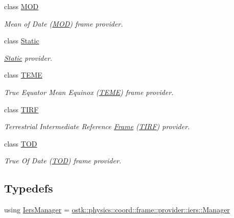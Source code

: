 \begin{DoxyCompactItemize}
class \hyperlink{classostk_1_1physics_1_1coord_1_1frame_1_1provider_1_1_m_o_d}{M\+OD}
\begin{DoxyCompactList}\small\item\em Mean of Date (\hyperlink{classostk_1_1physics_1_1coord_1_1frame_1_1provider_1_1_m_o_d}{M\+OD}) frame provider. \end{DoxyCompactList}\item 
class \hyperlink{classostk_1_1physics_1_1coord_1_1frame_1_1provider_1_1_static}{Static}
\begin{DoxyCompactList}\small\item\em \hyperlink{classostk_1_1physics_1_1coord_1_1frame_1_1provider_1_1_static}{Static} provider. \end{DoxyCompactList}\item 
class \hyperlink{classostk_1_1physics_1_1coord_1_1frame_1_1provider_1_1_t_e_m_e}{T\+E\+ME}
\begin{DoxyCompactList}\small\item\em True Equator Mean Equinox (\hyperlink{classostk_1_1physics_1_1coord_1_1frame_1_1provider_1_1_t_e_m_e}{T\+E\+ME}) frame provider. \end{DoxyCompactList}\item 
class \hyperlink{classostk_1_1physics_1_1coord_1_1frame_1_1provider_1_1_t_i_r_f}{T\+I\+RF}
\begin{DoxyCompactList}\small\item\em Terrestrial Intermediate Reference \hyperlink{classostk_1_1physics_1_1coord_1_1_frame}{Frame} (\hyperlink{classostk_1_1physics_1_1coord_1_1frame_1_1provider_1_1_t_i_r_f}{T\+I\+RF}) provider. \end{DoxyCompactList}\item 
class \hyperlink{classostk_1_1physics_1_1coord_1_1frame_1_1provider_1_1_t_o_d}{T\+OD}
\begin{DoxyCompactList}\small\item\em True Of Date (\hyperlink{classostk_1_1physics_1_1coord_1_1frame_1_1provider_1_1_t_o_d}{T\+OD}) frame provider. \end{DoxyCompactList}\end{DoxyCompactItemize}
\subsection*{Typedefs}
\begin{DoxyCompactItemize}
\item 
using \hyperlink{namespaceostk_1_1physics_1_1coord_1_1frame_1_1provider_a12fe12ec00381f0f866c1cb25df6b88f}{Iers\+Manager} = \hyperlink{classostk_1_1physics_1_1coord_1_1frame_1_1provider_1_1iers_1_1_manager}{ostk\+::physics\+::coord\+::frame\+::provider\+::iers\+::\+Manager}
\end{DoxyCompactItemize}
